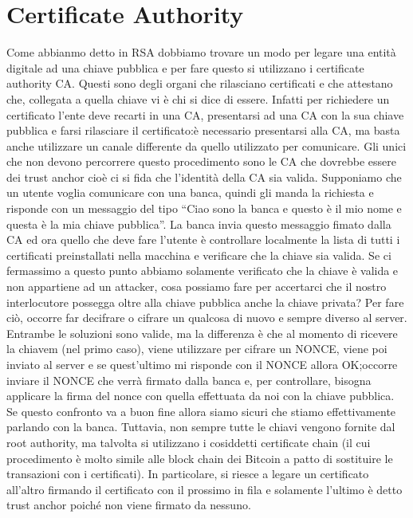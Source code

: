 \documentclass[a4paper,draft]{article}
\begin{document}
\section{Certificate Authority}
Come abbianmo detto in RSA dobbiamo trovare un modo per legare una entità digitale ad una chiave pubblica e per fare questo si utilizzano i certificate authority CA\@. Questi sono degli organi che rilasciano certificati e che attestano che, collegata a quella chiave vi è chi si dice di essere\@.\newline
Infatti per richiedere un certificato l'ente deve recarti in una CA, presentarsi ad una CA con la sua chiave pubblica e farsi rilasciare il certificato:\@non è necessario presentarsi alla CA, ma basta anche utilizzare un canale differente da quello utilizzato per comunicare\@.
Gli unici che non devono percorrere questo procedimento sono le CA che dovrebbe essere dei trust anchor cioè ci si fida che l'identità della CA sia valida\@.\newline
Supponiamo che un utente voglia comunicare con una banca, quindi gli manda la richiesta e risponde con un messaggio del tipo ``Ciao sono la banca e questo è il mio nome e questa è la mia chiave pubblica''\@. La banca invia questo messaggio fimato dalla CA ed ora quello che deve fare l'utente è controllare localmente la lista di tutti i certificati preinstallati nella macchina e verificare che la chiave sia valida\@.\newline
Se ci fermassimo a questo punto abbiamo solamente verificato che la chiave è valida e non appartiene ad un attacker, cosa possiamo fare per accertarci che il nostro interlocutore possegga oltre alla chiave pubblica anche la chiave privata?\@
Per fare ciò, occorre far decifrare o cifrare un qualcosa di nuovo e sempre diverso al server\@. Entrambe le soluzioni sono valide, ma la differenza è che al momento di ricevere la chiavem (nel primo caso), viene utilizzare per cifrare un NONCE, viene poi inviato al server e se quest'ultimo mi risponde con il NONCE allora OK;\@altrimenti occorre inviare il NONCE che verrà firmato dalla banca e, per controllare, bisogna applicare la firma del nonce con quella effettuata da noi con la chiave pubblica\@. Se questo confronto va a buon fine allora siamo sicuri che stiamo effettivamente parlando con la banca\@.\newline
Tuttavia, non sempre tutte le chiavi vengono fornite dal root authority, ma talvolta si utilizzano i cosiddetti certificate chain (il cui procedimento è molto simile alle block chain dei Bitcoin a patto di sostituire le transazioni con i certificati)\@. In particolare, si riesce a legare un certificato all'altro firmando il certificato con il prossimo in fila e solamente l'ultimo è detto trust anchor poiché non viene firmato da nessuno\@.
\end{document}

